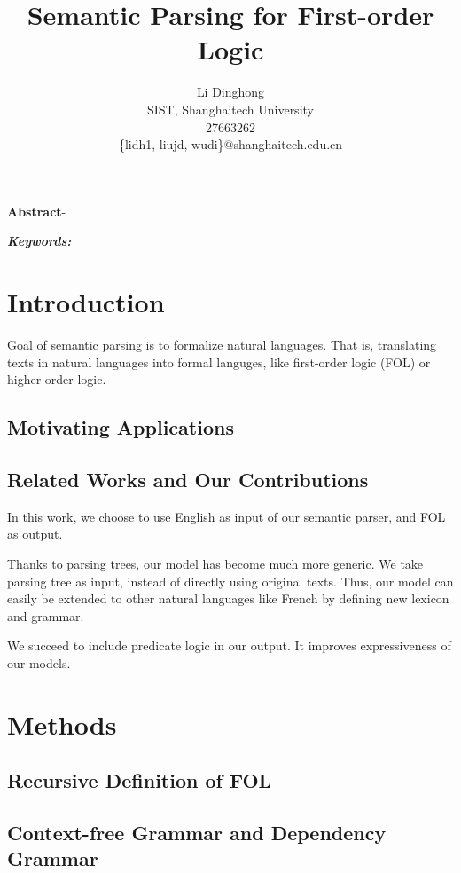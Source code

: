 \documentclass{article}
\title{Semantic Parsing for First-order Logic}
\author{
	Li Dinghong\\
	SIST, Shanghaitech University\\
	27663262\\
	\{lidh1, liujd, wudi\}@shanghaitech.edu.cn
}
\begin{document}
{
	\newpage
	\maketitle

	\textbf{Abstract}-{}

	\vspace{5pt}
	\textbf{\emph{Keywords:}} {}

	\tableofcontents
}

\section{Introduction}{
	Goal of semantic parsing is to formalize natural languages. That is, translating texts in natural languages into formal languges, like first-order logic (FOL) or higher-order logic. 

	\subsection{Motivating Applications}{
		\cite{su} 
	}
	
	\subsection{Related Works and Our Contributions}{
		In this work, we choose to use English as input of our semantic parser, and FOL as output. 



		Thanks to parsing trees, our model has become much more generic. We take parsing tree as input, instead of directly using original texts. Thus, our model can easily be extended to other natural languages like French by defining new lexicon and grammar. 

		We succeed to include predicate logic in our output. It improves expressiveness of our models. 

	}
}

\section{Methods}{
	\subsection{Recursive Definition of FOL}{}

	\subsection{Context-free Grammar and Dependency Grammar}{}
}
\end{document}
